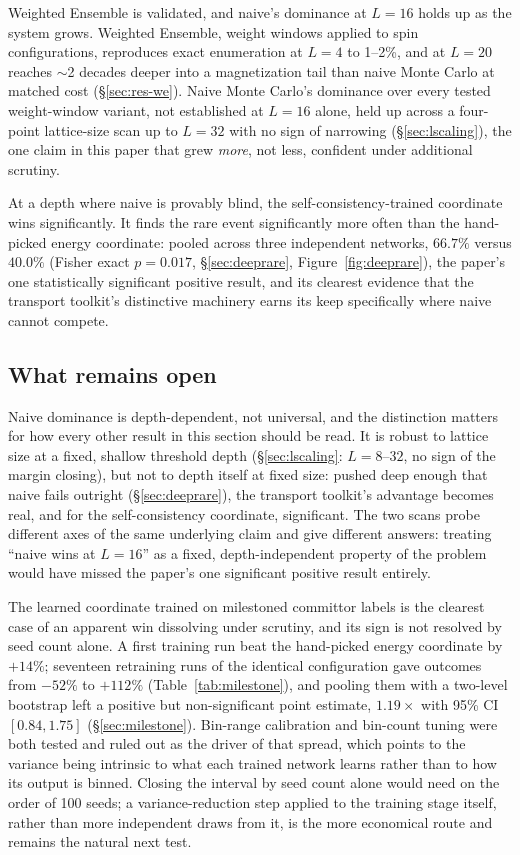 \documentclass[a4paper,fleqn]{cas-sc}
\let\Oldsubsection\subsection
\renewcommand{\subsection}{\FloatBarrier\Oldsubsection}
\begin{document}
	Weighted Ensemble is validated, and naive's dominance at $L=16$ holds up as the
	system grows. Weighted Ensemble, weight windows applied to spin configurations,
	reproduces exact enumeration at $L=4$ to 1--2\%, and at $L=20$ reaches $\sim$2 decades
	deeper into a magnetization tail than naive Monte Carlo at matched cost
	(\S\ref{sec:res-we}). Naive Monte Carlo's dominance over every tested weight-window
	variant, not established at $L=16$ alone, held up across a four-point lattice-size scan
	up to $L=32$ with no sign of narrowing (\S\ref{sec:lscaling}), the one claim in this
	paper that grew \emph{more}, not less, confident under additional scrutiny.
	
	At a depth where naive is provably blind, the self-consistency-trained
	coordinate wins significantly. It finds the rare event
	significantly more often than the hand-picked energy coordinate: pooled across three
	independent networks, $66.7\%$ versus $40.0\%$ (Fisher exact $p=0.017$,
	\S\ref{sec:deeprare}, Figure~\ref{fig:deeprare}), the paper's one statistically
	significant positive result, and
	its clearest evidence that the transport toolkit's distinctive machinery earns its keep
	specifically where naive cannot compete.
	
	\subsection{What remains open}
	Naive dominance is depth-dependent, not universal, and the distinction matters for
	how every other result in this section should be read. It is robust to lattice size at a
	fixed, shallow threshold depth (\S\ref{sec:lscaling}: $L=8$--$32$, no sign of the margin
	closing), but not to depth itself at fixed size: pushed deep enough that naive fails
	outright (\S\ref{sec:deeprare}), the transport toolkit's advantage becomes real, and for the
	self-consistency coordinate, significant. The two scans probe different axes of the same
	underlying claim and give different answers: treating ``naive wins at $L=16$'' as a fixed,
	depth-independent property of the problem would have missed the paper's one significant
	positive result entirely.
	
	The learned coordinate trained on milestoned committor labels is the clearest case
	of an apparent win dissolving under scrutiny, and its sign is not resolved by seed count
	alone. A first training run beat the hand-picked
	energy coordinate by $+14\%$; seventeen retraining runs of the identical configuration gave
	outcomes from $-52\%$ to $+112\%$ (Table~\ref{tab:milestone}), and pooling them with a
	two-level bootstrap left a positive but non-significant point estimate, $1.19\times$ with
	95\% CI $[0.84,1.75]$ (\S\ref{sec:milestone}). Bin-range calibration and bin-count tuning
	were both tested and ruled out as the driver of that spread, which points to the variance
	being intrinsic to what each trained network learns rather than to how its output is
	binned. Closing the interval by seed count alone would need on the order of 100 seeds; a
	variance-reduction step applied to the training stage itself, rather than more independent
	draws from it, is the more economical route and remains the natural next test.
	
\end{document}
